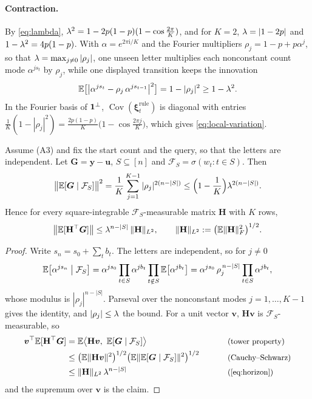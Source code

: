 \paragraph{Contraction.}\label{app:contraction} By \cref{eq:lambda}, $\mixrate^2=1-2p(1-p)(1-\cos\tfrac{2\pi}{K})$, and for $K=2$,
$\lambda=|1-2p|$ and $1-\lambda^2=4p(1-p)$. With $\alpha=e^{2\pi\mathrm i/K}$ and the Fourier multipliers
$\rho_j=1-p+p\alpha^j$, so that $\lambda=\max_{j\ne0}|\rho_j|$, one unseen letter multiplies each nonconstant count
mode $\alpha^{js_t}$ by $\rho_j$, while one displayed transition keeps the innovation
\begin{equation}
 \mathbb E\bigl[\bigl|\alpha^{j s_t}-\rho_j\,\alpha^{j s_{t-1}}\bigr|^2\bigr]=1-|\rho_j|^2\ge1-\lambda^2 .
 \label{eq:move-variance}
\end{equation}
In the Fourier basis of $\mathbf 1^\perp$, $\operatorname{Cov}(\bm\xi^{\mathrm{rule}}_t)$ is diagonal with entries $\tfrac{1}{K}(1-|\rho_j|^2)=\tfrac{2p(1-p)}{K}\bigl(1-\cos\tfrac{2\pi j}{K}\bigr)$,
which gives \cref{eq:local-variation}.

\begin{lemma}
\label{lem:target-contraction}
Assume (A3) and fix the start count and the query, so that the letters are independent. Let $\bm G=\bm y-\bm u$, $S\subseteq[n]$ and $\mathcal F_S=\sigma(w_t:t\in S)$. Then
\begin{equation}
 \bigl\|\mathbb E[\bm G\mid\mathcal F_S]\bigr\|^2=\frac{1}{K}\sum_{j=1}^{K-1}|\rho_j|^{2(n-|S|)}\le\Bigl(1-\frac{1}{K}\Bigr)\lambda^{2(n-|S|)} .
 \label{eq:horizon}
\end{equation}
Hence for every square-integrable $\mathcal F_S$-measurable matrix $\mathbf H$ with $K$ rows,
\[
 \bigl\|\mathbb E[\mathbf H^\top\bm G]\bigr\|\le\lambda^{n-|S|}\,\|\mathbf H\|_{L^2},\qquad \|\mathbf H\|_{L^2}:=\bigl(\mathbb E\|\mathbf H\|_F^2\bigr)^{1/2}.
\]
\end{lemma}

\begin{proof}
Write $s_n=s_0+\sum_tb_t$. The letters are independent, so for $j\ne0$
\[
 \mathbb E\bigl[\alpha^{js_n}\bigm|\mathcal F_S\bigr]=\alpha^{js_0}\prod_{t\in S}\alpha^{jb_t}\prod_{t\notin S}\mathbb E\bigl[\alpha^{jb_t}\bigr]=\alpha^{js_0}\,\rho_j^{\,n-|S|}\prod_{t\in S}\alpha^{jb_t},
\]
whose modulus is $|\rho_j|^{n-|S|}$. Parseval over the nonconstant modes $j=1,\ldots,K-1$ gives the identity, and $|\rho_j|\le\lambda$ the bound.
For a unit vector $\bm v$, $\mathbf H\bm v$ is $\mathcal F_S$-measurable, so
\begin{alignat*}{2}
 \bm v^\top\E[\mathbf H^\top\bm G]&=\E\bigl\langle\mathbf H\bm v,\ \E[\bm G\mid\mathcal F_S]\bigr\rangle &\qquad& \why{tower property}\\
 &\le\bigl(\E\|\mathbf H\bm v\|^2\bigr)^{1/2}\bigl(\E\|\E[\bm G\mid\mathcal F_S]\|^2\bigr)^{1/2} && \why{Cauchy--Schwarz}\\
 &\le\|\mathbf H\|_{L^2}\,\mixrate^{n-|S|} && \why{\cref{eq:horizon}}
\end{alignat*}
and the supremum over $\bm v$ is the claim.
\end{proof}

